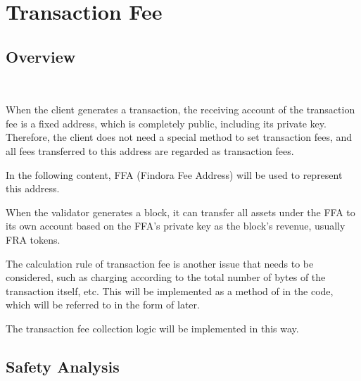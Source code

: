 \clearpage

\section{Transaction Fee}

\subsection{Overview}

~\par

When the client generates a transaction, the receiving account of the transaction fee
is a fixed address, which is completely public, including its private key.
Therefore, the client does not need a special method to set transaction fees,
and all fees transferred to this address are regarded as transaction fees.

In the following content, FFA (Findora Fee Address) will be used to represent this address.

When the validator generates a block, it can transfer all assets
under the FFA to its own account based on the FFA's private key as the block's revenue, usually FRA tokens.

The calculation rule of transaction fee is another issue that needs to be considered,
such as charging according to the total number of bytes of the transaction itself, etc.
This will be implemented as a method of  in the code,
which will be referred to in the form of  later.

The transaction fee collection logic will be implemented in this way.

\subsection{Safety Analysis}


